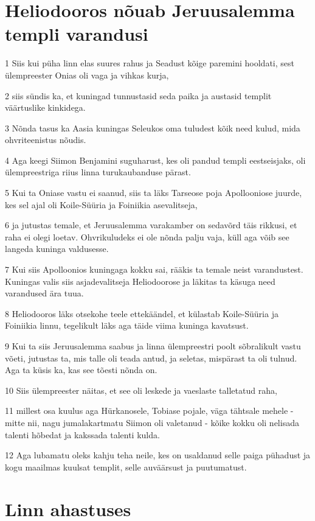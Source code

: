 \section*{Heliodooros nõuab Jeruusalemma templi varandusi}

\par 1 Siis kui püha linn elas suures rahus ja Seadust kõige paremini hooldati, sest ülempreester Onias oli vaga ja vihkas kurja,
\par 2 siis sündis ka, et kuningad tunnustasid seda paika ja austasid templit väärtuslike kinkidega.
\par 3 Nõnda tasus ka Aasia kuningas Seleukos oma tuludest kõik need kulud, mida ohvriteenistus nõudis.
\par 4 Aga keegi Siimon Benjamini suguharust, kes oli pandud templi eestseisjaks, oli ülempreestriga riius linna turukaubanduse pärast.
\par 5 Kui ta Oniase vastu ei saanud, siis ta läks Tarseose poja Apollooniose juurde, kes sel ajal oli Koile-Süüria ja Foiniikia asevalitseja,
\par 6 ja jutustas temale, et Jeruusalemma varakamber on sedavõrd täis rikkusi, et raha ei olegi loetav. Ohvrikuludeks ei ole nõnda palju vaja, küll aga võib see langeda kuninga valdusesse.
\par 7 Kui siis Apolloonios kuningaga kokku sai, rääkis ta temale neist varandustest. Kuningas valis siis asjadevalitseja Heliodoorose ja läkitas ta käsuga need varandused ära tuua.
\par 8 Heliodooros läks otsekohe teele ettekäändel, et külastab Koile-Süüria ja Foiniikia linnu, tegelikult läks aga täide viima kuninga kavatsust.
\par 9 Kui ta siis Jeruusalemma saabus ja linna ülempreestri poolt sõbralikult vastu võeti, jutustas ta, mis talle oli teada antud, ja seletas, mispärast ta oli tulnud. Aga ta küsis ka, kas see tõesti nõnda on.
\par 10 Siis ülempreester näitas, et see oli leskede ja vaeslaste talletatud raha,
\par 11 millest osa kuulus aga Hürkanosele, Tobiase pojale, väga tähtsale mehele - mitte nii, nagu jumalakartmatu Siimon oli valetanud - kõike kokku oli nelisada talenti hõbedat ja kakssada talenti kulda.
\par 12 Aga lubamatu oleks kahju teha neile, kes on usaldanud selle paiga pühadust ja kogu maailmas kuulsat templit, selle auväärsust ja puutumatust.


\section*{Linn ahastuses}

